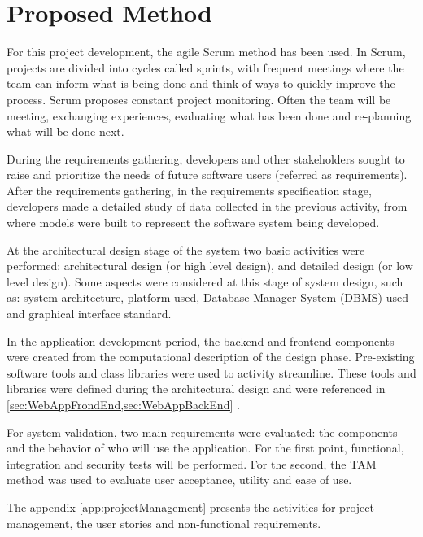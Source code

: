 \label{chap:useExample}

\acresetall 

\section{Proposed Method}\label{sec:method}

For this project development, the agile Scrum method has been used. In Scrum, projects are divided into cycles called sprints, with frequent meetings where the team can inform what is being done and think of ways to quickly improve the process. Scrum proposes constant project monitoring. Often the team will be meeting, exchanging experiences, evaluating what has been done and re-planning what will be done next.

During the requirements gathering, developers and other stakeholders sought to raise and prioritize the needs of future software users (referred as requirements). After the requirements gathering, in the requirements specification stage, developers made a detailed study of data collected in the previous activity, from where models were built to represent the software system being developed.

At the architectural design stage of the system two basic activities were performed: architectural design (or high level design), and detailed design (or low level design). Some aspects were considered at this stage of system design, such as: system architecture, platform used, Database Manager System (DBMS) used and graphical interface standard.

In the application development period, the backend and frontend components were created from the computational description of the design phase. Pre-existing software tools and class libraries were used to activity streamline. These tools and libraries were defined during the architectural design and were referenced in \cref{sec:WebAppFrondEnd,sec:WebAppBackEnd} .

For system validation, two main requirements were evaluated: the components and the behavior of who will use the application. For the first point, functional, integration and security tests will be performed. For the second, the \acf{TAM} method was used to evaluate user acceptance, utility and ease of use.

The appendix \ref{app:projectManagement} presents the activities for project management, the user stories and non-functional requirements. 


